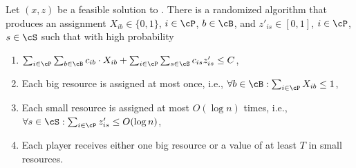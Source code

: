 \begin{lemma}
    \label{lem:cost-preservation}
    Let $(x,z)$ be a feasible solution to . There is a randomized algorithm that produces an assignment $X_{ib}\in\{0,1\}$, $i\in \cP$, $b\in\cB$, and $z'_{is}\in [0,1]$, $i\in \cP$, $s\in\cS$ such that
    with high probability
    \begin{enumerate}
        \item $\sum_{i\in\cP}\sum_{b\in\cB} c_{ib}\cdot X_{ib} +  \sum_{i\in\cP }\sum_{s\in\cS} c_{is} z'_{is} \leq C$, \label{eq:costs}
        \item Each big resource is assigned at most once, i.e., $\forall b\in \cB :\sum_{i\in\cP} X_{ib} \le 1$,
        \item Each small resource is assigned at most $O(\log n)$ times, i.e., $\forall s\in \cS: \sum_{i\in\cP} z'_{is} \le O(\log n)$,
        \item Each player receives either one big resource or a value of at least $T$ in small resources.
    \end{enumerate}
\end{lemma}
